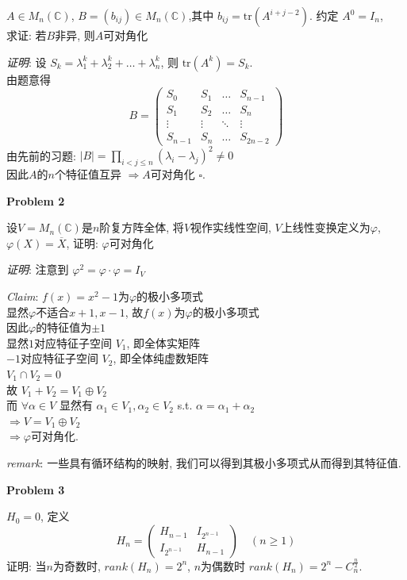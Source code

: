 $A \in M_n(\mathbb{C})$, $B=(b_{ij}) \in M_n(\mathbb{C})$,其中 $b_{ij} = \mathrm{tr}(A^{i+j-2})$. 约定 $A^0=I_n$,\\
求证: 若$B$非异, 则$A$可对角化

\textit{证明}: 设 $S_k = \lambda_1^k + \lambda_2^k + \dots + \lambda_n^k$, 则 $\mathrm{tr}(A^k)=S_k$.\\
由题意得
\[B=\begin{pmatrix}
S_0 & S_1 & \dots & S_{n-1} \\
S_1 & S_2 & \dots & S_n \\
\vdots & \vdots & \ddots & \vdots \\
S_{n-1} & S_n & \dots & S_{2n-2}
\end{pmatrix}\]
由先前的习题: $|B| = \prod_{i<j \leq n} (\lambda_i - \lambda_j)^2 \neq 0$\\
因此$A$的$n$个特征值互异 $\Rightarrow A$可对角化 $\square$.

\textbf{Problem 2}

设$V = M_n(\mathbb{C})$是$n$阶复方阵全体, 将$V$视作实线性空间, $V$上线性变换定义为$\varphi$, $\varphi(X) = \overline{X}$, 证明: $\varphi$可对角化

\textit{证明}: 注意到 $\varphi^2 = \varphi \cdot \varphi = I_V$

\textit{Claim}: $f(x)=x^2-1$为$\varphi$的极小多项式\\
显然$\varphi$不适合$x+1, x-1$, 故$f(x)$为$\varphi$的极小多项式\\
因此$\varphi$的特征值为$\pm 1$\\
显然$1$对应特征子空间 $V_1$, 即全体实矩阵\\
$-1$对应特征子空间 $V_2$, 即全体纯虚数矩阵\\
$V_1 \cap V_2 = 0$\\
故 $V_1 + V_2 = V_1 \oplus V_2$\\
而 $\forall \alpha \in V$ 显然有 $\alpha_1 \in V_1, \alpha_2 \in V_2$ s.t. $\alpha = \alpha_1 + \alpha_2$\\
$\Rightarrow V = V_1 \oplus V_2$\\
$\Rightarrow \varphi$可对角化.

\textit{remark}: 一些具有循环结构的映射, 我们可以得到其极小多项式从而得到其特征值.

\textbf{Problem 3}

$H_0=0$, 定义
\[
H_n = \begin{pmatrix} H_{n-1} & I_{2^{n-1}} \\ I_{2^{n-1}} & H_{n-1} \end{pmatrix} \quad (n\geq 1)
\]
证明: 当$n$为奇数时, $rank(H_n)=2^n$, $n$为偶数时 $rank(H_n)=2^n - C_n^{\frac{n}{2}}$.

